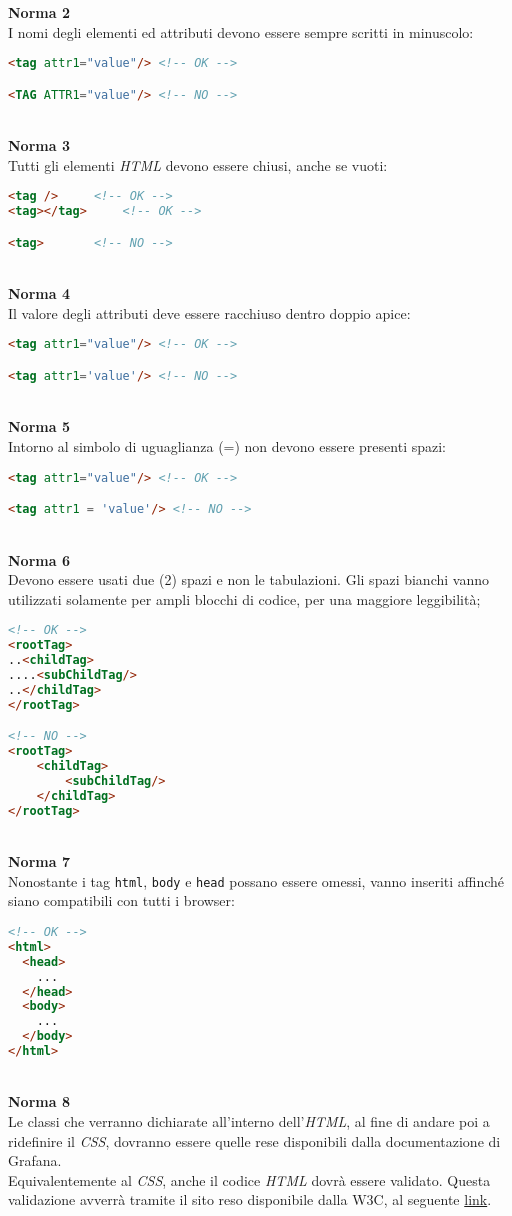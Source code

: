 \textbf{Norma 2}\\
I nomi degli elementi ed attributi devono essere sempre scritti in minuscolo: \\
	\begin{lstlisting}[language=HTML]
<tag attr1="value"/> <!-- OK -->

<TAG ATTR1="value"/> <!-- NO -->
\end{lstlisting}
\-\\
\textbf{Norma 3}\\
Tutti gli elementi \textit{HTML} devono essere chiusi, anche se vuoti: \\
	\begin{lstlisting}[language=HTML]
<tag /> 	<!-- OK -->
<tag></tag> 	<!-- OK -->

<tag> 		<!-- NO -->

\end{lstlisting}
\-\\
\textbf{Norma 4}\\
Il valore degli attributi deve essere racchiuso dentro doppio apice:\\
	\begin{lstlisting}[language=HTML]
<tag attr1="value"/> <!-- OK -->

<tag attr1='value'/> <!-- NO -->
\end{lstlisting}
\-\\
\textbf{Norma 5}\\
Intorno al simbolo di uguaglianza (=) non devono essere presenti spazi:\\
\begin{lstlisting}[language=HTML]
<tag attr1="value"/> <!-- OK -->

<tag attr1 = 'value'/> <!-- NO -->
\end{lstlisting}
\-\\
\textbf{Norma 6}\\
Devono essere usati due (2) spazi e non le tabulazioni. Gli spazi bianchi vanno utilizzati solamente per ampli blocchi di codice, per una maggiore leggibilità; \\
\begin{lstlisting}[language=HTML]
<!-- OK -->
<rootTag>
..<childTag>
....<subChildTag/>
..</childTag>  
</rootTag>

<!-- NO -->
<rootTag>
	<childTag>
		<subChildTag/>
	</childTag>  
</rootTag>
\end{lstlisting}
\-\\
\textbf{Norma 7}\\
Nonostante i tag \texttt{html}, \texttt{body} e \texttt{head} possano essere omessi, vanno inseriti affinché siano compatibili con tutti i browser:\\
\begin{lstlisting}[language=HTML]
<!-- OK -->
<html>
  <head>
    ...
  </head>
  <body>
    ...
  </body>
</html>
\end{lstlisting}
\-\\
\textbf{Norma 8}\\
Le classi che verranno dichiarate all'interno dell'\textit{HTML}, al fine di andare poi a ridefinire il \textit{CSS}, dovranno essere quelle rese disponibili dalla documentazione di Grafana.	\\

Equivalentemente al \textit{CSS}, anche il codice \textit{HTML} dovrà essere validato. Questa validazione avverrà tramite il sito reso disponibile dalla W3C, al seguente \href{https://validator.w3.org/}{link}.

